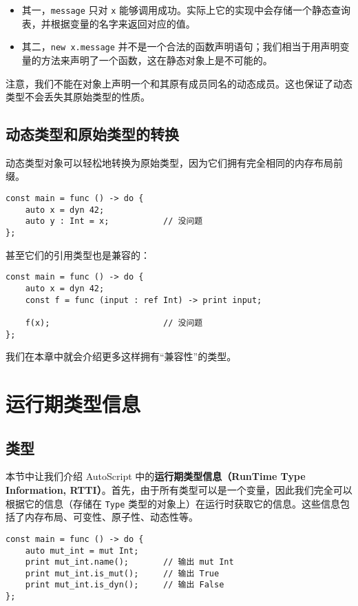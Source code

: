 \begin{itemize}
	\item 其一，\lstinline!message! 只对 \lstinline!x! 能够调用成功。实际上它的实现中会存储一个静态查询表，并根据变量的名字来返回对应的值。
	\item 其二，\lstinline!new x.message! 并不是一个合法的函数声明语句；我们相当于用声明变量的方法来声明了一个函数，这在静态对象上是不可能的。
\end{itemize}

注意，我们不能在对象上声明一个和其原有成员同名的动态成员。这也保证了动态类型不会丢失其原始类型的性质。


\subsection{动态类型和原始类型的转换}

动态类型对象可以轻松地转换为原始类型，因为它们拥有完全相同的内存布局前缀。

\begin{lstlisting}
const main = func () -> do {
	auto x = dyn 42;
	auto y : Int = x;			// 没问题
};
\end{lstlisting}

甚至它们的引用类型也是兼容的：

\begin{lstlisting}
const main = func () -> do {
	auto x = dyn 42;
	const f = func (input : ref Int) -> print input;
	
	f(x);						// 没问题
};
\end{lstlisting}

我们在本章中就会介绍更多这样拥有“兼容性”的类型。


\section{运行期类型信息}

\subsection{类型}

本节中让我们介绍 AutoScript 中的\textbf{运行期类型信息（RunTime Type Information, RTTI）}。首先，由于所有类型可以是一个变量，因此我们完全可以根据它的信息（存储在 \lstinline!Type! 类型的对象上）在运行时获取它的信息。这些信息包括了内存布局、可变性、原子性、动态性等。

\begin{lstlisting}
const main = func () -> do {
	auto mut_int = mut Int;
	print mut_int.name();		// 输出 mut Int
	print mut_int.is_mut();		// 输出 True
	print mut_int.is_dyn();		// 输出 False
};
\end{lstlisting}

